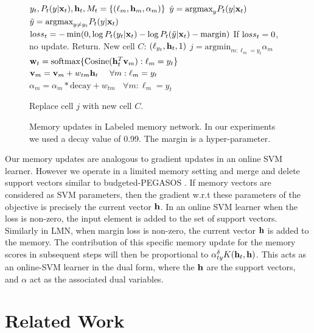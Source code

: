 \documentclass[letterpaper]{article} %
\newcommand{\vek}[1]{{\bf {#1}}}
\newcommand{\vx}{{\vek{x}}}
\newcommand{\vw}{{\vek{w}}}
\newcommand{\vh}{{\vek{h}}}
\newcommand{\vM}{{\vek{v}}}
\newcommand{\argmax}{{\text{argmax}}}
\newcommand{\argmin}{{\text{argmin}}}
\newcommand{\loss}{{\text loss}}
\begin{document}
\begin{figure}
\begin{center}
\begin{algorithmic}
   $y_t, P_t(y|\vx_t), \vh_t, M_t = \{(\ell_m, \vh_m, \alpha_m)\}$
  \STATE $\hat{y} = \argmax_y P_t(y|\vx_t)$
  \STATE $\tilde{y} = \argmax_{y \neq y_t} P_t(y|\vx_t)$
  \STATE $\loss_t = - \min(0, \log P_t(y_t|\vx_t) - \log P_t(\tilde{y}|\vx_t) - \text{margin} )$
  \STATE If $\loss_t=0$, no update. Return.
  \STATE New cell $C$: $(\ell_{y_t}, \vh_t, 1)$
  \STATE $j = \argmin_{m:\ell_m = y_t} \alpha_m$
  \STATE $\vw_t = \text{softmax}\{\text{Cosine}(\vh_t^T \vM_m) :\ell_m = y_t\}$
  \STATE $\vM_{m} = \vM_{m} + w_{tm}{\vh_t}~~~~\forall m: \ell_m = y_t$
  \STATE $\alpha_{m} = \alpha_m*\text{decay} + w_{tm}~~~~\forall m: \ell_m = y_t$

  \STATE Replace cell $j$ with new cell $C$.
  \ENDIF
\end{algorithmic}
\caption{\label{alg-write}Memory updates in Labeled memory network. In our experiments we used a decay value of 0.99.   The margin is a hyper-parameter.}
\end{center}
\end{figure}

Our memory updates are analogous to gradient updates in an online SVM learner. However we operate in a limited memory setting and merge and delete support vectors similar to budgeted-PEGASOS \cite{WangCV10}. If memory vectors are considered as SVM parameters, then the gradient w.r.t these parameters of the objective is precisely the current vector $\bf{h}$. In an online SVM learner when the loss is non-zero, the input element is added to the set of support vectors. Similarly in LMN, when margin loss is non-zero, the current vector $\bf{h}$ is added to the memory. The contribution of this specific memory update for the memory scores in subsequent steps will then be proportional to $\alpha_{ty}^\delta K(\vh_t, \bf{h})$. This acts as an online-SVM learner in the dual form, where the $\bf{h}$ are the support vectors, and $\alpha$ act as the associated dual variables.





\section{Related Work}
\end{document}
